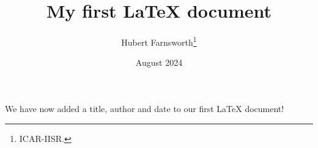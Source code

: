 \documentclass[12pt, letterpaper]{article}
\title{My first LaTeX document}
\author{Hubert Farnsworth\thanks{ICAR-IISR.}}
\date{August 2024}
\begin{document}
\maketitle
We have now added a title, author and date to our first \LaTeX{} document!
\end{document}
